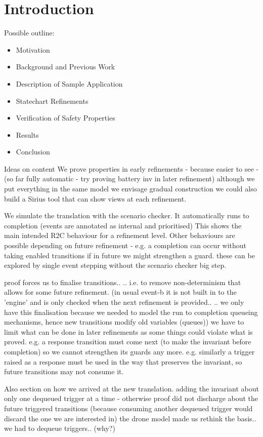 

\section{Introduction}

Possible outline:
\begin{itemize}
\item Motivation
\item Background and Previous Work
\item Description of Sample Application
\item Statechart Refinements
\item Verification of Safety Properties 
\item Results
\item Conclusion 
\end{itemize}

Ideas on content
We prove properties in early refinements - because easier to see - (so far fully automatic - try proving battery inv in later refinement)
	although we put everything in the same model we envisage gradual construction	
	we could also build a Sirius tool that can show views at each refinement.

We simulate the translation with the scenario checker. It automatically runs to completion (events are annotated as internal and prioritised)
This shows the main intended R2C behaviour for a refinement level.
Other behaviours are possible depending on future refinement - e.g. a completion can occur without taking enabled transitions if in future we might strengthen a guard.
	these can be explored by single event stepping without the scenario checker big step.

proof forces us to finalise transitions..
	.. i.e. to remove non-determinism that allows for some future refinement.
		(in usual event-b it is not built in to the 'engine' and is only checked when the next refinement is provided..
		.. we only have this finalisation because we needed to model the run to completion queueing mechanisms, hence new transitions modify old variables (queues))
	we have to limit what can be done in later refinements as some things could violate what is proved.
	e.g. a response transition must come next (to make the invariant before completion) so we cannot strengthen its guards any more.
	e.g. similarly a trigger raised as a response must be used in the way that preserves the invariant, so future transitions may not consume it.

Also section on how we arrived at the new translation.
	adding the invariant about only one dequeued trigger at a time - otherwise proof did not discharge about the future triggered transitions
		(because consuming another dequeued trigger would discard the one we are interested in)
	the drone model made us rethink the basis.. we had to dequeue triggers.. (why?)
